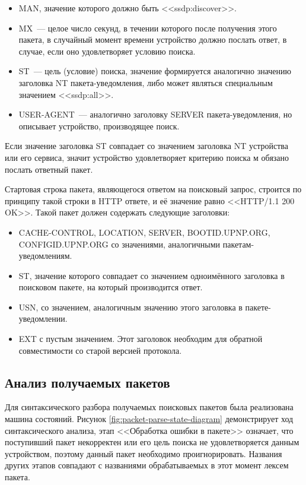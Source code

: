 \begin{itemize}
	\item MAN, значение которого должно быть <<ssdp:discover>>.
	\item MX~--- целое число секунд, в течении которого после получения этого пакета, в случайный момент времени устройство должно послать ответ, в случае, если оно удовлетворяет условию поиска.
	\item ST~--- цель (условие) поиска, значение формируется аналогично значению заголовка NT пакета-уведомления, либо может являться специальным значением <<ssdp:all>>.
	\item USER-AGENT~--- аналогично заголовку SERVER пакета-уведомления, но описывает устройство, производящее поиск.
\end{itemize}

Если значение заголовка ST совпадает со значением заголовка NT устройства или его сервиса, значит устройство удовлетворяет критерию поиска м обязано послать ответный пакет.

Стартовая строка пакета, являющегося ответом на поисковый запрос, строится по принципу такой строки в HTTP ответе, и её значение равно <<HTTP/1.1 200 OK>>.
Такой пакет должен содержать следующие заголовки:
\begin{itemize}
	\item CACHE-CONTROL, LOCATION, SERVER, BOOTID.UPNP.ORG, CONFIGID.UPNP.ORG со значениями, аналогичными пакетам-уведомлениям.
	\item ST, значение которого совпадает со значением одноимённого заголовка в поисковом пакете, на который производится ответ.
	\item USN, со значением, аналогичным значению этого заголовка в пакете-уведомлении.
	\item EXT с пустым значением.
Этот заголовок необходим для обратной совместимости со старой версией протокола.
\end{itemize}

\subsection{Анализ получаемых пакетов}

Для синтаксического разбора получаемых поисковых пакетов была реализована машина состояний.
Рисунок \ref{fig:packet-parse-state-diagram} демонстрирует ход синтаксического анализа, этап <<Обработка ошибки в пакете>> означает, что поступивший пакет некорректен или его цель поиска не удовлетворяется данным устройством, поэтому данный пакет необходимо проигнорировать.
Названия других этапов совпадают с названиями обрабатываемых в этот момент лексем пакета.

